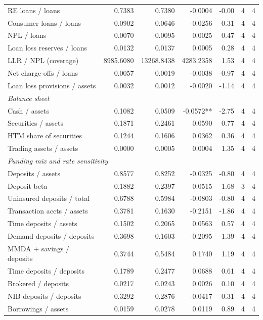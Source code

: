\begin{tabular}{lrrrrrr}
RE loans / loans & 0.7383 & 0.7380 & -0.0004 & -0.00 & 4 & 4 \\
Consumer loans / loans & 0.0902 & 0.0646 & -0.0256 & -0.31 & 4 & 4 \\
NPL / loans & 0.0070 & 0.0095 & 0.0025 & 0.47 & 4 & 4 \\
Loan loss reserves / loans & 0.0132 & 0.0137 & 0.0005 & 0.28 & 4 & 4 \\
LLR / NPL (coverage) & 8985.6080 & 13268.8438 & 4283.2358 & 1.53 & 4 & 4 \\
Net charge-offs / loans & 0.0057 & 0.0019 & -0.0038 & -0.97 & 4 & 4 \\
Loan loss provisions / assets & 0.0032 & 0.0012 & -0.0020 & -1.14 & 4 & 4 \\
\midrule
\multicolumn{7}{l}{\emph{Balance sheet}} \\
\midrule
Cash / assets & 0.1082 & 0.0509 & -0.0572** & -2.75 & 4 & 4 \\
Securities / assets & 0.1871 & 0.2461 & 0.0590 & 0.77 & 4 & 4 \\
HTM share of securities & 0.1244 & 0.1606 & 0.0362 & 0.36 & 4 & 4 \\
Trading assets / assets & 0.0000 & 0.0005 & 0.0004 & 1.35 & 4 & 4 \\
\midrule
\multicolumn{7}{l}{\emph{Funding mix and rate sensitivity}} \\
\midrule
Deposits / assets & 0.8577 & 0.8252 & -0.0325 & -0.80 & 4 & 4 \\
Deposit beta & 0.1882 & 0.2397 & 0.0515 & 1.68 & 3 & 4 \\
Uninsured deposits / total & 0.6788 & 0.5984 & -0.0803 & -0.80 & 4 & 4 \\
Transaction accts / assets & 0.3781 & 0.1630 & -0.2151 & -1.86 & 4 & 4 \\
Time deposits / assets & 0.1502 & 0.2065 & 0.0563 & 0.57 & 4 & 4 \\
Demand deposits / deposits & 0.3698 & 0.1603 & -0.2095 & -1.39 & 4 & 4 \\
MMDA + savings / deposits & 0.3744 & 0.5484 & 0.1740 & 1.19 & 4 & 4 \\
Time deposits / deposits & 0.1789 & 0.2477 & 0.0688 & 0.61 & 4 & 4 \\
Brokered / deposits & 0.0217 & 0.0243 & 0.0026 & 0.10 & 4 & 4 \\
NIB deposits / deposits & 0.3292 & 0.2876 & -0.0417 & -0.31 & 4 & 4 \\
Borrowings / assets & 0.0159 & 0.0278 & 0.0119 & 0.89 & 4 & 4 \\

\end{tabular}
